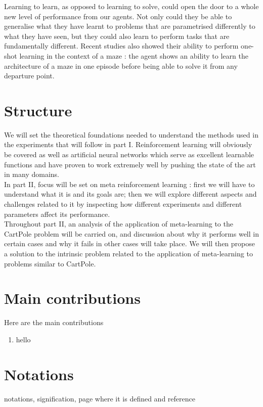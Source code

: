 Learning to learn, as opposed to learning to solve, could open the door to a
whole new level of performance from our agents. Not only could they 
be able to generalise what they have learnt to problems that are parametrised
differently to what they have seen, but they could also learn to perform
tasks that are fundamentally different. Recent studies \cite{learningtorl,
fastrlviaslowrl} also showed their ability to perform one-shot learning in
the context of a maze : the agent shows an ability to learn the architecture
of a maze in one episode before being able to solve it from any departure point.


\section{Structure}
We will set the theoretical foundations needed to understand the methods used
in the experiments that will follow in part I. Reinforcement learning will
obviously be covered as well as artificial neural networks which serve as 
excellent learnable functions and have proven to work extremely well by
pushing the state of the art in many domains.\\

In part II, focus will be set on meta reinforcement learning : first we will
have to understand what it is and its goals are; then we will explore different
aspects and challenges related to it by inspecting how different experiments
and different parameters affect its performance.\\

Throughout part II, an analysis of the application of meta-learning to the
CartPole problem will be carried on, and discussion about why it performs
well in certain cases and why it fails in other cases will take place. We will
then propose a solution to the intrinsic problem related to the application
of meta-learning to problems similar to CartPole.


\section{Main contributions}
\noindent
Here are the main contributions
\vspace{1cm}
\begin{enumerate}
    \item hello
\end{enumerate}

\clearpage
\section{Notations}

%
notations, signification, page where it is defined and reference
\
